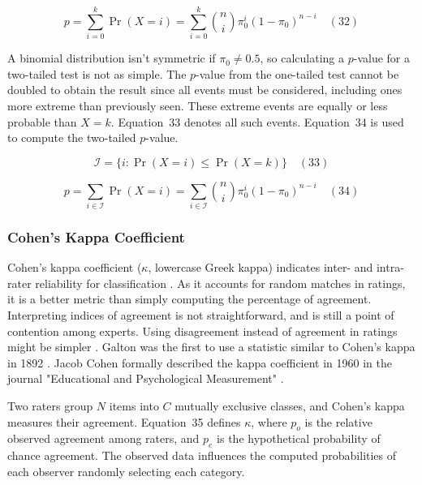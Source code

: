 \documentclass[preprint,12pt]{elsarticle}
\begin{document}
\begin{equation}
	p=\sum_{i=0}^{k}\Pr(X=i)=\sum_{i=0}^{k}{\binom{n}{i}}\pi_{0}^{i}(1-\pi_{0})^{n-i}
	\quad\left(32\right)
\end{equation}

A binomial distribution isn't symmetric if $\pi_{0}\neq 0.5$, so calculating a $p$-value for a two-tailed test is not as simple. The $p$-value from the one-tailed test cannot be doubled to obtain the result since all events must be considered, including ones more extreme than previously seen. These extreme events are equally or less probable than $X=k$. Equation~33 denotes all such events. Equation~34 is used to compute the two-tailed $p$-value.

\begin{equation}
	{\mathcal{I}}=\{i\colon \Pr(X=i)\leq \Pr(X=k)\}
	\quad\left(33\right)
\end{equation}

\begin{equation}
	p=\sum_{i\in {\mathcal{I}}}\Pr(X=i)=\sum_{i\in {\mathcal{I}}}{\binom{n}{i}}\pi_{0}^{i}(1-\pi_{0})^{n-i}
	\quad\left(34\right)
\end{equation}

\subsubsection{Cohen's Kappa Coefficient}

Cohen's kappa coefficient ($\kappa$, lowercase Greek kappa) indicates inter- and intra-rater reliability for classification \cite{mchugh2012interrater}. As it accounts for random matches in ratings, it is a better metric than simply computing the percentage of agreement. Interpreting indices of agreement is not straightforward, and is still a point of contention among experts. Using disagreement instead of agreement in ratings might be simpler \cite{pontius2011death}. Galton was the first to use a statistic similar to Cohen's kappa in 1892 \cite{galton1892finger, smeeton1985early}. Jacob Cohen formally described the kappa coefficient in 1960 in the journal "Educational and Psychological Measurement" \cite{cohen1960coefficient}.

Two raters group $N$ items into $C$ mutually exclusive classes, and Cohen's kappa measures their agreement. Equation~35 defines $\kappa$, where $p_{o}$ is the relative observed agreement among raters, and $p_{e}$ is the hypothetical probability of chance agreement. The observed data influences the computed probabilities of each observer randomly selecting each category.
\end{document}
